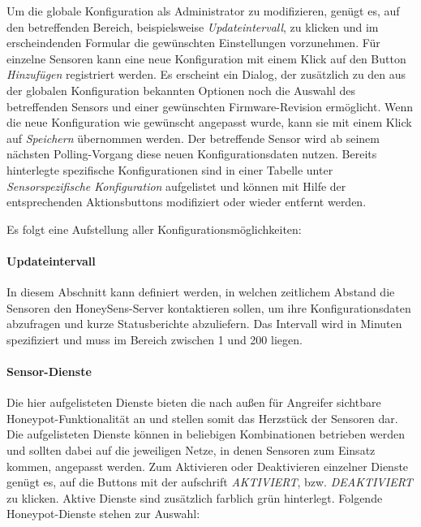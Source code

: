 \documentclass[12pt]{article}
\begin{document}
Um die globale Konfiguration als Administrator zu modifizieren, genügt es, auf den betreffenden Bereich, beispielsweise \textit{Updateintervall}, zu klicken und im erscheindenden Formular die gewünschten Einstellungen vorzunehmen. Für einzelne Sensoren kann eine neue Konfiguration mit einem Klick auf den Button \textit{Hinzufügen} registriert werden. Es erscheint ein Dialog, der zusätzlich zu den aus der globalen Konfiguration bekannten Optionen noch die Auswahl des betreffenden Sensors und einer gewünschten Firmware-Revision ermöglicht. Wenn die neue Konfiguration wie gewünscht angepasst wurde, kann sie mit einem Klick auf \textit{Speichern} übernommen werden. Der betreffende Sensor wird ab seinem nächsten Polling-Vorgang diese neuen Konfigurationsdaten nutzen. Bereits hinterlegte spezifische Konfigurationen sind in einer Tabelle unter \textit{Sensorspezifische Konfiguration} aufgelistet und können mit Hilfe der entsprechenden Aktionsbuttons modifiziert oder wieder entfernt werden.

Es folgt eine Aufstellung aller Konfigurationsmöglichkeiten:

\paragraph{Updateintervall}
In diesem Abschnitt kann definiert werden, in welchen zeitlichem Abstand die Sensoren den HoneySens-Server kontaktieren sollen, um ihre Konfigurationsdaten abzufragen und kurze Statusberichte abzuliefern. Das Intervall wird in Minuten spezifiziert und muss im Bereich zwischen 1 und 200 liegen.

\paragraph{Sensor-Dienste}
Die hier aufgelisteten Dienste bieten die nach außen für Angreifer sichtbare Honeypot-Funktionalität an und stellen somit das Herzstück der Sensoren dar. Die aufgelisteten Dienste können in beliebigen Kombinationen betrieben werden und sollten dabei auf die jeweiligen Netze, in denen Sensoren zum Einsatz kommen, angepasst werden. Zum Aktivieren oder Deaktivieren einzelner Dienste genügt es, auf die Buttons mit der aufschrift \textit{AKTIVIERT}, bzw. \textit{DEAKTIVIERT} zu klicken. Aktive Dienste sind zusätzlich farblich grün hinterlegt. Folgende Honeypot-Dienste stehen zur Auswahl:
\end{document}
